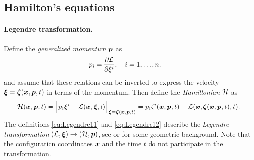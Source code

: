 \vfill
\subsection{Hamilton's equations}\label{sec:HamiltonsEquations}
\paragraph{Legendre transformation.}
Define the \textit{generalized momentum} $\genMomentum$ as
\begin{align}\label{eq:Legendre11}
 \genMomentumCoeff{\LidxI} &= \pdiff[\Lagrangian]{\sysVelCoeff{\LidxI}}, \quad \LidxI = 1,\ldots,\dimConfigSpace
 .
\end{align}
and assume that these relations can be inverted to express the velocity $\sysVel = \tuple{\zeta}(\sysCoord, \genMomentum, t)$ in terms of the momentum.
Then define the \textit{Hamiltonian} $\Hamiltonian$ as
\begin{align}\label{eq:Legendre12}
 \Hamiltonian(\sysCoord, \genMomentum, t) 
 = \Big[ \genMomentumCoeff{\LidxI} \sysVelCoeff{\LidxI} - \Lagrangian(\sysCoord, \sysVel, t) \Big]_{\sysVel = \tuple{\zeta}(\sysCoord, \genMomentum, t)}
 = \genMomentumCoeff{\LidxI} \zeta^{\LidxI}(\sysCoord, \genMomentum, t) - \Lagrangian(\sysCoord, \tuple{\zeta}(\sysCoord, \genMomentum, t), t)
 .
\end{align}
The definitions \eqref{eq:Legendre11} and \eqref{eq:Legendre12} describe the \textit{Legendre transformation} $(\Lagrangian, \sysVel) \rightarrow (\Hamiltonian, \genMomentum)$, see \cite[ch.\,VI.1]{Lanczos:Variational} or \cite[sec.\,14]{Arnold:MathematicalMethodsOfClassicalMechanics} for some geometric background.
Note that the configuration coordinates $\sysCoord$ and the time $t$ do not participate in the transformation.

